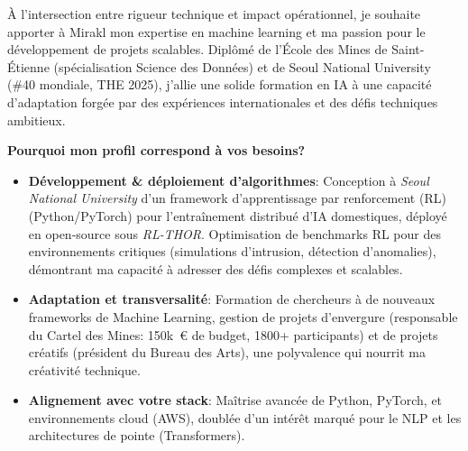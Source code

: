 
\newcommand{\Company}{Mirakl Labs}
\recipient{\RecruitmentTeam{\Company}}{\Company\\Paris\\France}
\makelettertitle

À l'intersection entre rigueur technique et impact opérationnel, je souhaite apporter à Mirakl mon expertise en machine learning et ma passion pour le développement de projets scalables. Diplômé de l'École des Mines de Saint-Étienne (spécialisation Science des Données) et de Seoul National University (\#40 mondiale, THE 2025), j'allie une solide formation en IA à une capacité d'adaptation forgée par des expériences internationales et des défis techniques ambitieux.

\textbf{Pourquoi mon profil correspond à vos besoins?}
\begin{itemize}
    \item \textbf{Développement \& déploiement d'algorithmes}:
          Conception à \textit{Seoul National University} d'un framework d'apprentissage par renforcement (RL) (Python/PyTorch) pour l'entraînement distribué d'IA domestiques, déployé en open-source sous \textit{RL-THOR}.
          Optimisation de benchmarks RL pour des environnements critiques (simulations d'intrusion, détection d'anomalies), démontrant ma capacité à adresser des défis complexes et scalables.
    \item \textbf{Adaptation et transversalité}: Formation de chercheurs à de nouveaux frameworks de Machine Learning, gestion de projets d'envergure (responsable du Cartel des Mines: 150k~€ de budget, 1800+ participants) et de projets créatifs (président du Bureau des Arts), une polyvalence qui nourrit ma créativité technique.
    \item \textbf{Alignement avec votre stack}: Maîtrise avancée de Python, PyTorch, et environnements cloud (AWS), doublée d'un intérêt marqué pour le NLP et les architectures de pointe (Transformers).
\end{itemize}
\vspace{7pt}


